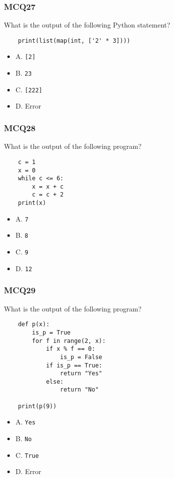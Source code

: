 \documentclass{beamer}
\begin{document}
\begin{frame}[fragile]
    \frametitle{MCQ27}
    What is the output of the following Python statement?
    \begin{verbatim}
    print(list(map(int, ['2' * 3])))
    \end{verbatim}
    \begin{itemize}
        \item A. \texttt{[2]}
        \item B. \texttt{23}
        \item C. \texttt{[222]}
        \item D. Error
    \end{itemize}
\end{frame}

\begin{frame}[fragile]
    \frametitle{MCQ28}
    What is the output of the following program?
    \begin{verbatim}
    c = 1
    x = 0
    while c <= 6:
        x = x + c
        c = c + 2
    print(x)
    \end{verbatim}
    \begin{itemize}
        \item A. \texttt{7}
        \item B. \texttt{8}
        \item C. \texttt{9}
        \item D. \texttt{12}
    \end{itemize}
\end{frame}

\begin{frame}[fragile]
    \frametitle{MCQ29}
    What is the output of the following program?
    \begin{verbatim}
    def p(x):
        is_p = True
        for f in range(2, x):
            if x % f == 0:
                is_p = False
            if is_p == True:
                return "Yes"
            else:
                return "No"

    print(p(9))
    \end{verbatim}
    \begin{itemize}
        \item A. \texttt{Yes}
        \item B. \texttt{No}
        \item C. \texttt{True}
        \item D. Error
    \end{itemize}
\end{frame}
\end{document}
